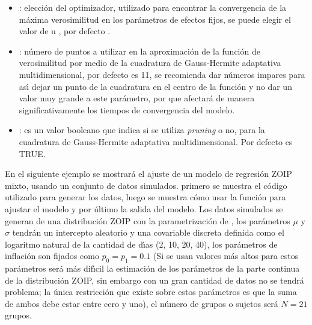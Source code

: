 \begin{itemize}[noitemsep, nolistsep]
.
\item {}: elecci\'{o}n del optimizador, utilizado para encontrar la convergencia de la m\'{a}xima verosimilitud en los par\'{a}metros de efectos fijos, se puede elegir el valor de  u , por defecto .
\item {}: n\'{u}mero de puntos a utilizar en la aproximaci\'{o}n de la funci\'{o}n de ve\-ro\-si\-mi\-li\-tud por medio de la cuadratura de Gauss-Hermite adaptativa multidimensional, por defecto es 11, se recomienda dar n\'{u}meros impares para as\'{\i} dejar un punto de la cuadratura en el centro de la funci\'{o}n y no dar un valor muy grande a este par\'{a}metro, por que afectar\'{a} de manera significativamente los tiempos de convergencia del modelo.
\item {}: es un valor booleano que indica si se utiliza \textit{pruning} o no, para la cuadratura de Gauss-Hermite adaptativa multidimensional. Por defecto es TRUE.

\end{itemize}

En el siguiente ejemplo se mostrar\'{a} el ajuste de un modelo de regresi\'{o}n ZOIP mixto, usando un conjunto de datos simulados. primero se muestra el c\'{o}digo utilizado para generar los datos, luego se muestra c\'{o}mo usar la funci\'{o}n  para ajustar el modelo y por \'{u}ltimo la salida del modelo. Los datos simulados se generan de una distribuci\'{o}n ZOIP con la parametrizaci\'{o}n de \cite{Stasinopoulos2}, los par\'{a}metros $\mu$ y $\sigma$ tendr\'{a}n un intercepto aleatorio y una covariable discreta definida como el logaritmo natural de la cantidad de d\'{\i}as (2, 10, 20, 40), los par\'{a}metros de inflaci\'{o}n son fijados como $p_0=p_1=0.1$ (Si se usan valores m\'{a}s altos para estos par\'{a}metros ser\'{a} m\'{a}s dif\'{\i}cil la estimaci\'{o}n de los par\'{a}metros de la parte continua de la distribuci\'{o}n ZOIP, sin embargo con un gran cantidad de datos no se tendr\'{a} problema; la \'{u}nica restricci\'{o}n que existe sobre estos par\'{a}metros es que la suma de ambos debe estar entre cero y uno), el n\'{u}mero de grupos o sujetos ser\'{a} $N=21$ grupos.

